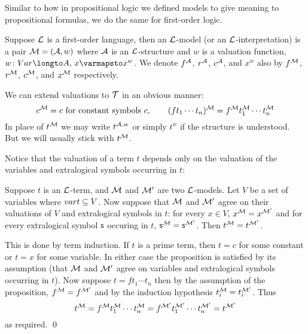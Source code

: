 Similar to how in propositional logic we defined models to give meaning to propositional formulas, we do the same for first-order logic.

\bdefn

    Suppose ${\cal L}$ is a first-order language, then an {\emphcolor ${\cal L}$-model} (or an {\emphcolor ${\cal L}$-interpretation}) is a pair ${\cal M}=({\cal A},w)$ where ${\cal A}$ is
    an ${\cal L}$-structure and $w$ is a {\emphcolor valuation function}, $w\colon\Var\longto A,\,x\varmapsto x^w$.
    We denote $f^{\cal A}$, $r^{\cal A}$, $c^{\cal A}$, and $x^w$ also by $f^{\cal M}$, $r^{\cal M}$, $c^{\cal M}$, and $x^{\cal M}$ respectively.

\edefn

We can extend valuations to ${\cal T}$ in an obvious manner:
$$ c^{\cal M} = c\hbox{ for constant symbols $c$},\qquad (ft_1\cdots t_n)^{\cal M} = f^{\cal M}t_1^{\cal M}\cdots t_n^{\cal M} $$
In place of $t^{\cal M}$ we may write $t^{{\cal A},w}$ or simply $t^w$ if the structure is understood.
But we will usually stick with $t^{\cal M}$.

Notice that the valuation of a term $t$ depends only on the valuation of the variables and extralogical symbols occurring in $t$:

\bprop[name=termcoincidenceprop]

    Suppose $t$ is an ${\cal L}$-term, and ${\cal M}$ and ${\cal M}'$ are two ${\cal L}$-models.
    Let $V$ be a set of variables where ${\sl var} t\subseteq V$.
    Now suppose that ${\cal M}$ and ${\cal M}'$ agree on their valuations of $V$ and extralogical symbols in $t$: for every $x\in V$, $x^{\cal M}=x^{{\cal M}'}$ and for every extralogical symbol ${\sf s}$
    occuring in $t$, ${\sf s}^{\cal M}={\sf s}^{{\cal M}'}$.
    Then $t^{\cal M}=t^{{\cal M}'}$.

\eprop

This is done by term induction.
If $t$ is a prime term, then $t=c$ for some constant or $t=x$ for some variable.
In either case the proposition is satisfied by its assumption (that ${\cal M}$ and ${\cal M}'$ agree on variables and extralogical symbols occurring in $t$).
Now suppose $t=ft_1\cdots t_n$ then by the assumption of the proposition, $f^{\cal M}=f^{{\cal M}'}$ and by the induction hypothesis $t_i^{\cal M}=t_i^{{\cal M}'}$.
Thus
$$ t^{\cal M} = f^{\cal M}t_1^{\cal M}\cdots t_n^{\cal M} = f^{{\cal M}'}t_1^{{\cal M}'}\cdots t_n^{{\cal M}'} = t^{{\cal M}'} $$
as required.
\qed


